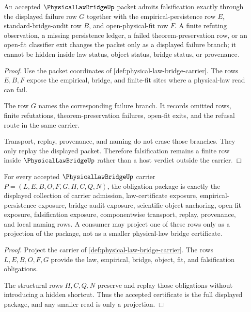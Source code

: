 \begin{theorem}
\label{thm:physical-law-bridge-falsification-boundary}
An accepted $\PhysicalLawBridgeUp$ packet admits falsification exactly through the displayed failure row $G$ together with the empirical-persistence row $E$, standard-bridge-audit row $B$, and open-physical-fit row $F$. A finite refuting observation, a missing persistence ledger, a failed theorem-preservation row, or an open-fit classifier exit changes the packet only as a displayed failure branch; it cannot be hidden inside law status, object status, bridge status, or provenance.
\end{theorem}
\begin{proof}
Use the packet coordinates of \autoref{def:physical-law-bridge-carrier}. The rows $E,B,F$ expose the empirical, bridge, and finite-fit sites where a physical-law read can fail.

The row $G$ names the corresponding failure branch. It records omitted rows, finite refutations, theorem-preservation failures, open-fit exits, and the refusal route in the same carrier.

Transport, replay, provenance, and naming do not erase those branches. They only replay the displayed packet. Therefore falsification remains a finite row inside $\PhysicalLawBridgeUp$ rather than a host verdict outside the carrier.
\end{proof}

\begin{theorem}
\label{thm:physical-law-bridge-obligation-package}
For every accepted $\PhysicalLawBridgeUp$ carrier $P=(L,E,B,O,F,G,H,C,Q,N)$, the obligation package is exactly the displayed collection of carrier admission, law-certificate exposure, empirical-persistence exposure, bridge-audit exposure, scientific-object anchoring, open-fit exposure, falsification exposure, componentwise transport, replay, provenance, and local naming rows. A consumer may project one of these rows only as a projection of the package, not as a smaller physical-law bridge certificate.
\end{theorem}
\begin{proof}
Project the carrier of \autoref{def:physical-law-bridge-carrier}. The rows $L,E,B,O,F,G$ provide the law, empirical, bridge, object, fit, and falsification obligations.

The structural rows $H,C,Q,N$ preserve and replay those obligations without introducing a hidden shortcut. Thus the accepted certificate is the full displayed package, and any smaller read is only a projection.
\end{proof}

